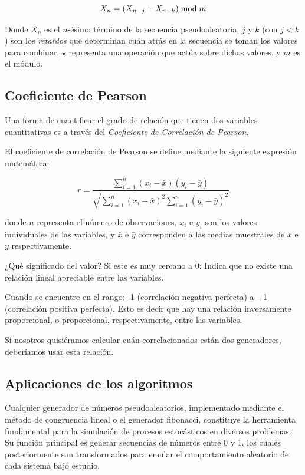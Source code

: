\documentclass[baaa]{baaa}
\begin{document}
\begin{equation}
\centering
X_n = (X_{n-j} + X_{n-k}) \bmod m
\end{equation}

Donde \( X_n \) es el \( n \)-ésimo término de la secuencia pseudoaleatoria, \( j \) y \( k \) (con \( j < k \)) son los \textit{retardos} que determinan cuán atrás en la secuencia se toman los valores para combinar, \( \star \) representa una operación que actúa sobre dichos valores, y \( m \) es el módulo.

\subsection{Coeficiente de Pearson}

Una forma de cuantificar el grado de relación que tienen dos variables cuantitativas es a través del \textit{Coeficiente de Correlación de Pearson.} 

El coeficiente de correlación de Pearson se define mediante la siguiente expresión matemática:

\begin{equation}
r = \frac{\sum\limits_{i=1}^{n} (x_i - \bar{x})(y_i - \bar{y})}{\sqrt{\sum\limits_{i=1}^{n} (x_i - \bar{x})^2 \sum\limits_{i=1}^{n} (y_i - \bar{y})^2}}
\end{equation}

donde $n$ representa el número de observaciones, $x_i$ e $y_i$ son los valores individuales de las variables, y $\bar{x}$ e $\bar{y}$ corresponden a las medias muestrales de $x$ e $y$ respectivamente.

¿Qué significado del valor? Si este es muy cercano a 0: Indica que no existe una relación lineal apreciable entre las variables.

Cuando se encuentre en el rango: -1 (correlación negativa perfecta) a +1 (correlación positiva perfecta). Esto es decir que hay una relación inversamente proporcional, o proporcional, respectivamente, entre las variables. 

Si nosotros quisiéramos calcular cuán correlacionados están dos generadores, deberíamos usar esta relación. 

\subsection{Aplicaciones de los algoritmos}

Cualquier generador de números pseudoaleatorios, implementado mediante el método de congruencia lineal o el generador fibonacci, constituye la herramienta fundamental para la simulación de procesos estocásticos en diversos problemas. Su función principal es generar secuencias de números entre 0 y 1, los cuales posteriormente son transformados para emular el comportamiento aleatorio de cada sistema bajo estudio.
\end{document}
